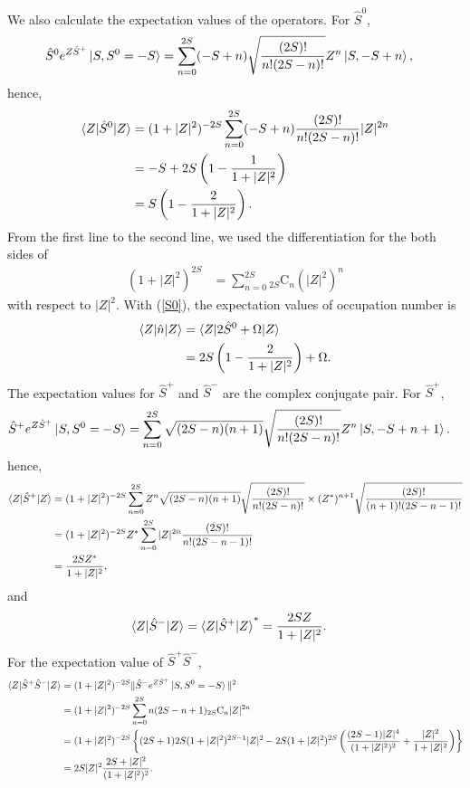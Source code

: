 \documentclass[11pt]{book} %
\begin{document}
We also calculate the expectation values of the operators. For $\hat{S}^0$,
\begin{align}
  \hat{S}^0e^{Z \hat{S}^+}\ket{S,S^0=-S} &= \sum_{n=0}^{2S}(-S+n)\sqrt{\frac{(2S)!}{n!(2S-n)!}}Z^n\ket{S,-S+n} ,
\end{align}
hence,
\begin{align}
  \braket{Z|\hat{S}^0|Z} &= (1+|Z|^2)^{-2S}\sum_{n=0}^{2S}(-S+n)\frac{(2S)!}{n!(2S-n)!}|Z|^{2n} \nonumber \\
  &= -S + 2S\left( 1-\frac{1}{1+|Z|^2} \right) \nonumber \\
  &= S\left( 1-\frac{2}{1+|Z|^2} \right) .
  \label{S0}
\end{align}
From the first line to the second line, we used the differentiation for the both sides of
\begin{align}
  (1+|Z|^2)^{2S} &= \sum_{n=0}^{2S} {}_{2S}\mathrm{C}_n(|Z|^2)^n
\end{align}
with respect to $|Z|^2$. With (\ref{S0}), the expectation values of occupation number is
\begin{align}
  \braket{Z|\hat{n}|Z} &= \braket{Z|2\hat{S}^0+\Omega|Z} \nonumber \\
	&= 2S\left( 1-\frac{2}{1+|Z|^2} \right) + \Omega .
\end{align}
The expectation values for $\hat{S}^+$ and $\hat{S}^-$ are the complex conjugate pair. For $\hat{S}^+$,
\begin{align}
  \hat{S}^+e^{Z \hat{S}^+}\ket{S,S^0=-S} &= \sum_{n=0}^{2S}\sqrt{(2S-n)(n+1)}\sqrt{\frac{(2S)!}{n!(2S-n)!}}Z^n\ket{S,-S+n+1}.
\end{align}
hence, 
\begin{align}
  \braket{Z|\hat{S}^+|Z} &= (1+|Z|^2)^{-2S}\sum_{n=0}^{2S}Z^n\sqrt{(2S-n)(n+1)}\sqrt{\frac{(2S)!}{n!(2S-n)!}}
  \times(Z^*)^{n+1}\sqrt{\frac{(2S)!}{(n+1)!(2S-n-1)!}} \nonumber \\
    &= (1+|Z|^2)^{-2S} Z^*\sum_{n=0}^{2S}|Z|^{2n}\frac{(2S)!}{n!(2S-n-1)!} \nonumber \\
    &= \frac{2SZ^*}{1+|Z|^2} ,
   \label{S+}
\end{align} 
and
\begin{align}
  \braket{Z|\hat{S}^-|Z} &= \braket{Z|\hat{S}^+|Z}^* = \frac{2SZ}{1+|Z|^2} .
  \label{S-}
\end{align}
For the expectation value of $\hat{S}^+\hat{S}^-$,
\begin{align}
  \braket{Z|\hat{S}^+\hat{S}^-|Z} &= (1+|Z|^2)^{-2S}\|\hat{S}^-e^{Z \hat{S}^+}\ket{S,S^0=-S}\|^2 \nonumber \\
  &= (1+|Z|^2)^{-2S}\sum_{n=0}^{2S}n(2S-n+1){}_{2S}\mathrm{C}_n|Z|^{2n} \nonumber \\
  &= (1+|Z|^2)^{-2S} \left\{ (2S+1)2S(1+|Z|^2)^{2S-1}|Z|^2 - 2S(1+|Z|^2)^{2S}
  \left( \frac{(2S-1)|Z|^4}{(1+|Z|^2)^2}+\frac{|Z|^2}{1+|Z|^2} \right) \right\} \nonumber \\
  &= 2S|Z|^2\frac{2S+|Z|^2}{(1+|Z|^2)^2} .
  \label{S+S-}
\end{align}
\end{document}
